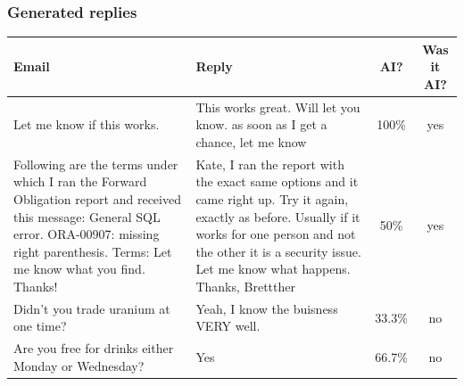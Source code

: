 \documentclass{beamer}
\begin{document}
\begin{frame}
  \frametitle{Generated replies}

  \begin{table}
    \scriptsize
    \begin{tabularx}{\textwidth}{|X|X|c|c|}
      \hline
      \textbf{Email}                                                                                                                                                                                        & \textbf{Reply}                                                                                                                                                                                                                     & \textbf{AI?}   & \textbf{Was it AI?} \\
      \hline
      Let me know if this works.                                                                                                                                                                            & This works great. Will let you know. as soon as I get a chance, let me know                                                                                                                                                        & \num{100}{\%}  & yes                 \\
      \hline
      Following are the terms under which I ran the Forward Obligation report and received this message: General SQL error. ORA-00907: missing right parenthesis. Terms: Let me know what you find. Thanks! & Kate, I ran the report with the exact same options and it came right up. Try it again, exactly as before. Usually if it works for one person and not the other it is a security issue. Let me know what happens. Thanks, Brettther & \num{50}{\%}   & yes                 \\
      \hline
      Didn't you trade uranium at one time?                                                                                                                                                                 & Yeah, I know the buisness VERY well.                                                                                                                                                                                               & \num{33.3}{\%} & no                  \\
      \hline
      Are you free for drinks either Monday or Wednesday?                                                                                                                                                   & Yes                                                                                                                                                                                                                                & \num{66.7}{\%} & no                  \\

\end{tabularx}
\end{table}
\end{frame}
\end{document}
